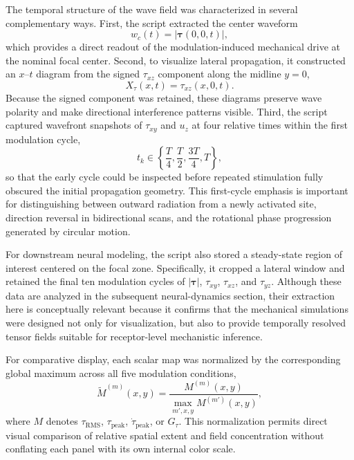 \documentclass[pdflatex, sn-nature]{sn-jnl}
\theoremstyle{thmstyleone}%
\theoremstyle{thmstyletwo}%
\theoremstyle{thmstylethree}%
\begin{document}
The temporal structure of the wave field was characterized in several complementary ways. First, the script extracted the center waveform
\begin{equation}
    w_c(t)=|\boldsymbol{\tau}(0,0,t)|,
\end{equation}
which provides a direct readout of the modulation-induced mechanical drive at the nominal focal center. Second, to visualize lateral propagation, it constructed an $x$--$t$ diagram from the signed $\tau_{xz}$ component along the midline $y=0$,
\begin{equation}
    X_{\tau}(x,t)=\tau_{xz}(x,0,t).
\end{equation}
Because the signed component was retained, these diagrams preserve wave polarity and make directional interference patterns visible. Third, the script captured wavefront snapshots of $\tau_{xy}$ and $u_z$ at four relative times within the first modulation cycle,
\begin{equation}
    t_k \in \left\{\frac{T}{4},\frac{T}{2},\frac{3T}{4},T\right\},
\end{equation}
so that the early cycle could be inspected before repeated stimulation fully obscured the initial propagation geometry. This first-cycle emphasis is important for distinguishing between outward radiation from a newly activated site, direction reversal in bidirectional scans, and the rotational phase progression generated by circular motion.

For downstream neural modeling, the script also stored a steady-state region of interest centered on the focal zone. Specifically, it cropped a  lateral window and retained the final ten modulation cycles of $|\boldsymbol{\tau}|$, $\tau_{xy}$, $\tau_{xz}$, and $\tau_{yz}$. Although these data are analyzed in the subsequent neural-dynamics section, their extraction here is conceptually relevant because it confirms that the mechanical simulations were designed not only for visualization, but also to provide temporally resolved tensor fields suitable for receptor-level mechanistic inference.

For comparative display, each scalar map was normalized by the corresponding global maximum across all five modulation conditions,
\begin{equation}
    \tilde{M}^{(m)}(x,y)=\frac{M^{(m)}(x,y)}{\max_{m',x,y} M^{(m')}(x,y)},
\end{equation}
where $M$ denotes $\tau_{\mathrm{RMS}}$, $\tau_{\mathrm{peak}}$, $\dot{\tau}_{\mathrm{peak}}$, or $G_{\tau}$. This normalization permits direct visual comparison of relative spatial extent and field concentration without conflating each panel with its own internal color scale.
\end{document}
